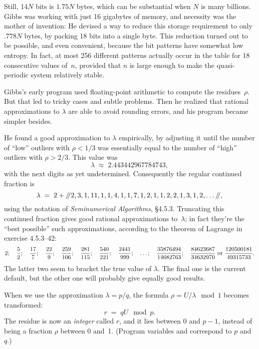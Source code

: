 Still, $14N$ bits is $1.75N$ bytes, which can be substantial
when $N$ is many billions. Gibbs was working with just 16 gigabytes
of memory, and necessity was the mother of invention:
He devised a way to reduce this storage requirement
to only $.778N$ bytes, by packing 18 bits into a single byte. This reduction
turned out to be possible, and even convenient,
because the bit patterns have somewhat low entropy.
In fact, at most 256 different patterns actually occur in the 
table
for 18 consecutive values of~$n$, provided that $n$ is large enough
to make the quasi-periodic system relatively stable.

\fi

Gibbs's early program used floating-point arithmetic to compute
the residues~$\rho$. But that led to tricky cases and subtle problems.
Then he realized that rational approximations to $\lambda$ are able to avoid
rounding errors, and his program became simpler besides.

He found a good approximation to $\lambda$ empirically, by adjusting it
until the number of ``low'' outliers with $\rho<1/3$ was essentially equal to
the number of ``high'' outliers with $\rho>2/3$. This value was
$$\lambda\;\approx\;2.443442967784743,$$
with the next digits as yet undetermined. Consequently the
regular continued fraction is
$$\lambda\;=\;
2+/\mkern-4.5mu/ 2,3,1,11,1,1,4,1,1,7,1,2,1,1,2,2,1,3,1,2,\ldots{}/\mkern-4.5mu/,$$
using the notation of {\sl Seminumerical Algorithms}, \S4.5.3.
Truncating this continued fraction gives good rational approximations
to~$\lambda$; in fact they're the ``best possible'' such approximations,
according to the theorem of Lagrange in exercise 4.5.3--42:
$$2;\quad
{5\over2};\quad
{17\over7};\quad
{22\over9};\quad
{259\over106};\quad
{281\over115};\quad
{540\over221};\quad
{2441\over999};\quad
\ldots;\quad
{35876494\over14682763};\quad
{84623687\over34632970}\hbox{ or }
{120500181\over49315733}.$$
The latter two seem to bracket the true value of $\lambda$. The final one
is the current default, but the other one will probably give equally good
results.

When we use the approximation $\lambda=p/q$, the formula $\rho
=U/\lambda\mod1$ becomes transformed:
$$r\;=\;qU\mod p.$$
The residue is now an {\it integer\/} called $r$, and it lies between 0 and
$p-1$, instead of being a fraction $\rho$ between 0 and~1.
(Program variables  and  correspond to $p$ and $q$.)

